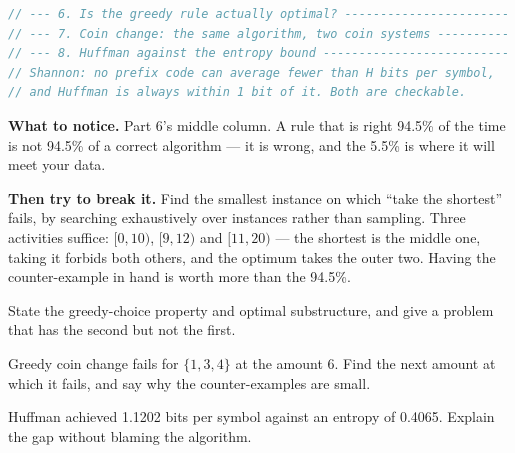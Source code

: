 \begin{lab}
\begin{lstlisting}[language=C++]
// --- 6. Is the greedy rule actually optimal? -----------------------
// --- 7. Coin change: the same algorithm, two coin systems ----------
// --- 8. Huffman against the entropy bound --------------------------
// Shannon: no prefix code can average fewer than H bits per symbol,
// and Huffman is always within 1 bit of it. Both are checkable.
\end{lstlisting}

\textbf{What to notice.} Part 6's middle column. A rule that is right 94.5\% of
the time is not 94.5\% of a correct algorithm --- it is wrong, and the 5.5\% is
where it will meet your data.

\smallskip
\textbf{Then try to break it.} Find the smallest instance on which ``take the
shortest'' fails, by searching exhaustively over instances rather than
sampling. Three activities suffice: $[0,10)$, $[9,12)$ and $[11,20)$ --- the
shortest is the middle one, taking it forbids both others, and the optimum
takes the outer two. Having the counter-example in hand is worth more than the
94.5\%.
\end{lab}

\begin{checkpoint}
\begin{tightnum}
  \item State the greedy-choice property and optimal substructure, and give a
        problem that has the second but not the first.
  \item Greedy coin change fails for $\{1,3,4\}$ at the amount 6. Find the next
        amount at which it fails, and say why the counter-examples are small.
  \item Huffman achieved 1.1202 bits per symbol against an entropy of 0.4065.
        Explain the gap without blaming the algorithm.
\end{tightnum}
\end{checkpoint}

